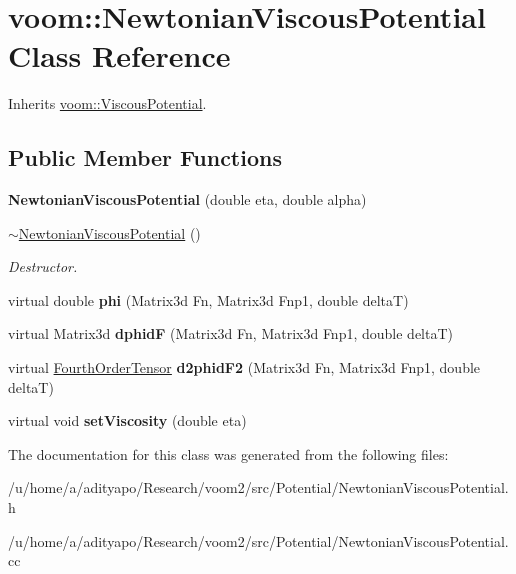 \hypertarget{classvoom_1_1_newtonian_viscous_potential}{
\section{voom::NewtonianViscousPotential Class Reference}
\label{classvoom_1_1_newtonian_viscous_potential}
}


Inherits \hyperlink{classvoom_1_1_viscous_potential}{voom::ViscousPotential}.\subsection*{Public Member Functions}
\begin{DoxyCompactItemize}
\item 
\hypertarget{classvoom_1_1_newtonian_viscous_potential_a78a6d03c8794a1b116725965e7533d5b}{
{\bfseries NewtonianViscousPotential} (double eta, double alpha)}
\label{classvoom_1_1_newtonian_viscous_potential_a78a6d03c8794a1b116725965e7533d5b}

\item 
\hypertarget{classvoom_1_1_newtonian_viscous_potential_a2fb03f5d708e62381bdf03fa473c538c}{
\hyperlink{classvoom_1_1_newtonian_viscous_potential_a2fb03f5d708e62381bdf03fa473c538c}{$\sim$NewtonianViscousPotential} ()}
\label{classvoom_1_1_newtonian_viscous_potential_a2fb03f5d708e62381bdf03fa473c538c}

\begin{DoxyCompactList}\small\item\em Destructor. \item\end{DoxyCompactList}\item 
\hypertarget{classvoom_1_1_newtonian_viscous_potential_a8d186823bbaf0d0316c720a90ee0a0ad}{
virtual double {\bfseries phi} (Matrix3d Fn, Matrix3d Fnp1, double deltaT)}
\label{classvoom_1_1_newtonian_viscous_potential_a8d186823bbaf0d0316c720a90ee0a0ad}

\item 
\hypertarget{classvoom_1_1_newtonian_viscous_potential_a74fd6851294285ba2cf8b5a2606c186d}{
virtual Matrix3d {\bfseries dphidF} (Matrix3d Fn, Matrix3d Fnp1, double deltaT)}
\label{classvoom_1_1_newtonian_viscous_potential_a74fd6851294285ba2cf8b5a2606c186d}

\item 
\hypertarget{classvoom_1_1_newtonian_viscous_potential_adab00a025ab17aceb1da25e31718b6f0}{
virtual \hyperlink{classvoom_1_1_fourth_order_tensor}{FourthOrderTensor} {\bfseries d2phidF2} (Matrix3d Fn, Matrix3d Fnp1, double deltaT)}
\label{classvoom_1_1_newtonian_viscous_potential_adab00a025ab17aceb1da25e31718b6f0}

\item 
\hypertarget{classvoom_1_1_newtonian_viscous_potential_a5a33f4804cccf3de1bd37198df656544}{
virtual void {\bfseries setViscosity} (double eta)}
\label{classvoom_1_1_newtonian_viscous_potential_a5a33f4804cccf3de1bd37198df656544}

\end{DoxyCompactItemize}


The documentation for this class was generated from the following files:\begin{DoxyCompactItemize}
\item 
/u/home/a/adityapo/Research/voom2/src/Potential/NewtonianViscousPotential.h\item 
/u/home/a/adityapo/Research/voom2/src/Potential/NewtonianViscousPotential.cc\end{DoxyCompactItemize}
